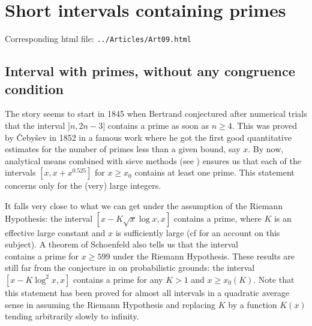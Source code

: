 \chapter{   Short intervals containing primes}

Corresponding html file: \texttt{../Articles/Art09.html}










 
 







\section{Interval with primes, without any congruence condition}




The story seems to start in 1845 when Bertrand conjectured after
numerical trials
that the interval $]n,2n-3]$ contains a prime as soon as $n\ge4$. This was proved
by \v Ceby\v sev in 1852 in a famous work where he got the first good
quantitative estimates for the number of primes less than a given bound,
say $x$. By now, analytical means combined with sieve methods
(see
\cite{Baker-Harman-Pintz*01}
)
ensures us that each of the
intervals $[x,x+x^{0.525}]$ for $x \geq x_0$
contains at least one prime.
This statement concerns only for the (very) large integers.

It falls very close to what we can get under the assumption
of the Riemann
Hypothesis: the interval $[x-K\sqrt{x}\log x,x]$ contains a prime, where
$K$ is an effective large constant and $x$ is sufficiently large
(cf
\cite{Wolke*83}
for an account on this subject). A theorem
of Schoenfeld
\cite{Schoenfeld*76}
also tells us that the interval
\begin{equation*}
  [x-\sqrt{x}\log^2x/(4\pi),x]
\end{equation*}
contains a prime for $x\geq 599$ under the Riemann Hypothesis. These results
are still far from the conjecture in
\cite{Cramer*36}
on
probabilistic grounds: the interval $[x-K\log^2x,x]$ contains a prime for any
$K>1$ and $x\geq x_0(K)$. Note that this statement has been proved for almost
all intervals in a quadratic average sense in
\cite{Selberg*43}
assuming the Riemann Hypothesis and replacing $K$ by a function $K(x)$ tending
arbitrarily slowly to infinity.



